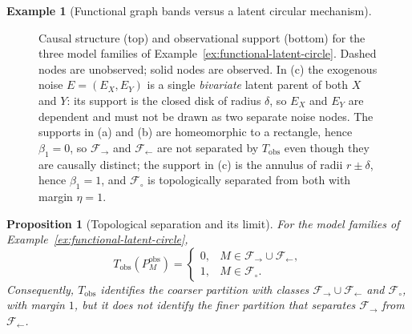 \documentclass[11pt,a4paper]{article}
\theoremstyle{plain}
\newtheorem{proposition}[theorem]{Proposition}
\theoremstyle{definition}
\newtheorem{example}[theorem]{Example}
\theoremstyle{remark}
\newcommand{\1}{\mathbbm{1}}
\begin{document}
\begin{example}[Functional graph bands versus a latent circular mechanism]
\begin{figure}[htbp]
 
\caption{Causal structure (top) and observational support (bottom) for the
three model families of Example~\ref{ex:functional-latent-circle}. Dashed
nodes are unobserved; solid nodes are observed. In (c) the exogenous noise
$E=(E_X,E_Y)$ is a single \emph{bivariate} latent parent of both $X$ and
$Y$: its support is the closed disk of radius $\delta$, so $E_X$ and $E_Y$
are dependent and must not be drawn as two separate noise nodes. The
supports in (a) and (b) are homeomorphic to a rectangle, hence
$\beta_1=0$, so $\mathcal F_\to$ and $\mathcal F_\leftarrow$ are not
separated by $T_{\mathrm{obs}}$ even though they are causally distinct; the
support in (c) is the annulus of radii $r\pm\delta$, hence $\beta_1=1$, and
$\mathcal F_\circ$ is topologically separated from both with margin
$\eta=1$.}
\label{fig:dag-topological-separation}
\end{figure}

\end{example}



\begin{proposition}[Topological separation and its limit]
\label{prop:functional-circle-separation}
For the model families of Example~\ref{ex:functional-latent-circle},
\[
T_{\mathrm{obs}}(P_M^{\mathrm{obs}})
=
\begin{cases}
0,
&
M\in\mathcal F_\to\cup\mathcal F_\leftarrow,
\\
1,
&
M\in\mathcal F_\circ.
\end{cases}
\]
Consequently, \(T_{\mathrm{obs}}\) identifies the coarser
partition with classes
\(\mathcal F_\to\cup\mathcal F_\leftarrow\) and
\(\mathcal F_\circ\), with margin \(1\), but it does not
identify the finer partition that separates
\(\mathcal F_\to\) from \(\mathcal F_\leftarrow\).
\end{proposition}
\end{document}
